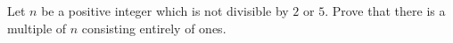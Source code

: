 Let $n$ be a positive integer which is not divisible by $2$ or $5$. Prove that there is a multiple of $n$ consisting entirely of ones.

